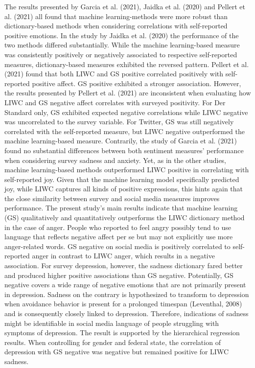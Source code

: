 \documentclass[
  english,
  jou,floatsintext]{apa7}
\begin{document}
The results presented by Garcia et al. (2021), Jaidka et al. (2020) and Pellert et al. (2021) all found that machine learning-methods were more robust than dictionary-based methods when considering correlations with self-reported positive emotions. In the study by Jaidka et al. (2020) the performance of the two methods differed substantially. While the machine learning-based measure was consistently positively or negatively associated to respective self-reported measures, dictionary-based measures exhibited the reversed pattern. Pellert et al. (2021) found that both LIWC and GS positive correlated positively with self-reported positive affect. GS positive exhibited a stronger association. However, the results presented by Pellert et al. (2021) are inconsistent when evaluating how LIWC and GS negative affect correlates with surveyed positivity. For Der Standard only, GS exhibited expected negative correlations while LIWC negative was uncorrelated to the survey variable. For Twitter, GS was still negatively correlated with the self-reported measure, but LIWC negative outperformed the machine learning-based measure. Contrarily, the study of Garcia et al. (2021) found no substantial differences between both sentiment measures' performance when considering survey sadness and anxiety. Yet, as in the other studies, machine learning-based methods outperformed LIWC positive in correlating with self-reported joy. Given that the machine learning model specifically predicted joy, while LIWC captures all kinds of positive expressions, this hints again that the close similarity between survey and social media measures improves performance.
The present study's main results indicate that machine learning (GS) qualitatively and quantitatively outperforms the LIWC dictionary method in the case of anger. People who reported to feel angry possibly tend to use language that reflects negative affect per se but may not explicitly use more anger-related words. GS negative on social media is positively correlated to self-reported anger in contrast to LIWC anger, which results in a negative association. For survey depression, however, the sadness dictionary fared better and produced higher positive associations than GS negative. Potentially, GS negative covers a wide range of negative emotions that are not primarily present in depression. Sadness on the contrary is hypothesized to transform to depression when avoidance behavior is present for a prolonged timespan (Leventhal, 2008) and is consequently closely linked to depression. Therefore, indications of sadness might be identifiable in social media language of people struggling with symptoms of depression. The result is supported by the hierarchical regression results. When controlling for gender and federal state, the correlation of depression with GS negative was negative but remained positive for LIWC sadness.\\
\end{document}
